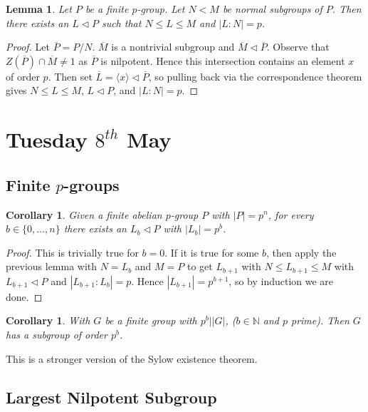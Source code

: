 \documentclass[a4paper,10pt]{article}
\newcommand{\NN}{\mathbb{N}}
\newtheorem{Cor}[thm]{Corollary}
\newtheorem{Lem}[thm]{Lemma}
\begin{document}
\begin{Lem}
Let $P$ be a finite $p$-group. Let $N < M$ be normal subgroups of $P$. Then there exists an $L \triangleleft P$ such that $N \leq L \leq M$ and $|L : N| = p$. 
\end{Lem}

\begin{proof}
Let $\overline{P} = P / N$. $\overline{M}$ is a nontrivial subgroup and $\overline{M} \triangleleft \overline{P}$. Observe that $Z(\overline{P}) \cap \overline{M} \neq 1$ as $\overline{P}$ is nilpotent. Hence this intersection contains an element $x$ of order $p$. Then set $\overline{L} = \langle x \rangle \triangleleft \overline{P}$, so pulling back via the correspondence theorem gives $N \leq L \leq M$, $L \triangleleft P$, and $|L:N| = p$.
\end{proof}



\newpage
\section{Tuesday $8^{th}$ May}

\subsection{Finite $p$-groups}

\begin{Cor}
Given a finite abelian $p$-group $P$ with $|P| = p^n$, for every $b \in \{0, \dots, n\}$ there exists an $L_b \triangleleft P$ with $|L_b| = p^b$. 
\end{Cor}

\begin{proof}
This is trivially true for $b=0$. If it is true for some $b$, then apply the previous lemma with $N = L_b$ and $M = P$ to get $L_{b+1}$ with $N \leq L_{b+1} \leq M$ with $L_{b+1} \triangleleft P$ and $|L_{b+1} : L_b| = p$. Hence $|L_{b+1}| = p^{b+1}$, so by induction we are done. 
\end{proof}

\begin{Cor}
With $G$ be a finite group with $p^b | |G|$, ($b \in \NN$ and $p$ prime). Then $G$ has a subgroup of order $p^b$. 
\end{Cor}
This is a stronger version of the Sylow existence theorem. 


\subsection{Largest Nilpotent Subgroup}
\end{document}
